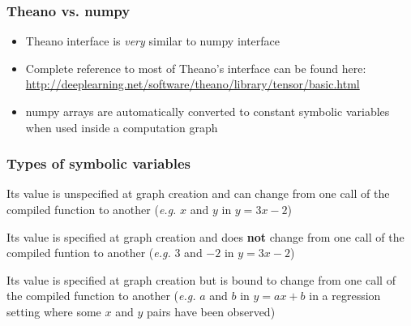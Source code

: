 \documentclass[mathserif, xcolor=dvipsnames]{beamer}
\begin{document}
\begin{frame}
    \frametitle{Theano vs. numpy}
    \begin{itemize}\addtolength{\itemsep}{1.0\baselineskip}
        \item{Theano interface is \emph{very} similar to numpy interface}
        \item{Complete reference to most of Theano's interface can be found
              here: \linebreak
 \url{http://deeplearning.net/software/theano/library/tensor/basic.html}}
        \item{numpy arrays are automatically converted to constant symbolic
              variables when used inside a computation graph}
    \end{itemize}
\end{frame}

\begin{frame}
    \frametitle{Types of symbolic variables}
    \begin{description}\addtolength{\itemsep}{1.0\baselineskip}
        \item[TensorVariable]{Its value is unspecified at graph creation and
                              can change from one call of the compiled function
                              to another (\emph{e.g.} $x$ and $y$ in
                              $y = 3x - 2$)}
        \item[TensorConstant]{Its value is specified at graph creation and
                              does \textbf{not} change from one call of the
                              compiled funtion to another (\emph{e.g.} $3$ and
                              $-2$ in $y = 3x - 2$)}
        \item[TensorSharedVariable]{Its value is specified at graph creation
                                    but is bound to change from one call of the
                                    compiled function to another (\emph{e.g.}
                                    $a$ and $b$ in $y = ax + b$ in a regression
                                    setting where some $x$ and $y$ pairs have
                                    been observed)}
    \end{description}
\end{frame}
\end{document}
